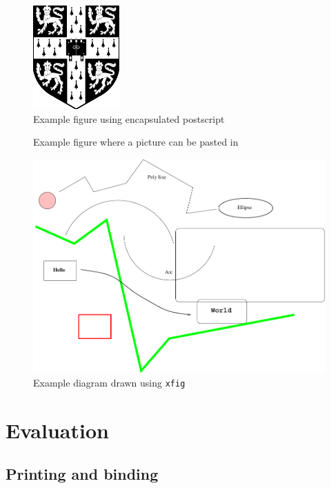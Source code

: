 \documentclass[12pt,a4paper,twoside,openright]{report}
\begin{document}
\begin{figure}[tbh]
\centerline{\includegraphics{figs/cuarms.pdf}}
\caption{Example figure using encapsulated postscript}
\label{epsfig}
\end{figure}

\begin{figure}[tbh]
\vspace{4in}
\caption{Example figure where a picture can be pasted in}
\label{pastedfig}
\end{figure}


\begin{figure}[tbh]
\centerline{\includegraphics{figs/diagram.pdf}}
\caption{Example diagram drawn using \texttt{xfig}}
\label{xfig}
\end{figure}


\chapter{Evaluation}

\section{Printing and binding}
\end{document}
